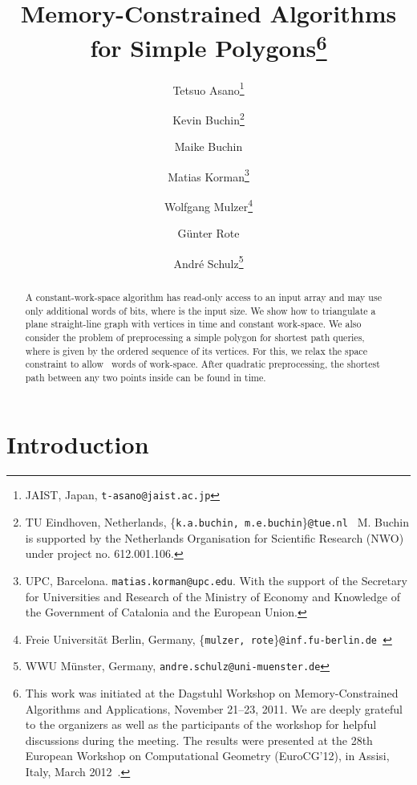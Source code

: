\documentclass[11pt,a4paper]{article}
\begin{document}
\title{Memory-Constrained Algorithms for Simple Polygons\thanks{This work was initiated at the Dagstuhl Workshop on
Memory-Constrained Algorithms and Applications,
 November 21--23, 2011. We are deeply grateful
to the organizers as well as the participants of the workshop for
helpful discussions during the meeting.
The results were presented
at the
28th European Workshop on Computational Geometry (EuroCG'12), in Assisi, Italy, March 2012~\cite{abbkmrs-mcasp-12}.}}

\author{
Tetsuo Asano\thanks{JAIST, Japan, \texttt{t-asano@jaist.ac.jp}} \and
Kevin Buchin\thanks{TU Eindhoven, Netherlands, \{\texttt{k.a.buchin, m.e.buchin}\}\texttt{@tue.nl } M. Buchin is supported by the Netherlands Organisation for Scientific Research
(NWO) under project no. 612.001.106. } \and
Maike Buchin\footnotemark[3] \and
Matias Korman\thanks{UPC, Barcelona. {\tt{matias.korman@upc.edu}}. With the support of the Secretary for Universities and
Research of the Ministry of Economy and Knowledge of the Government of Catalonia and the European Union.} \and
Wolfgang Mulzer\thanks{Freie Universit\"at Berlin,
Germany, \{\texttt{mulzer, rote}\}\texttt{@inf.fu-berlin.de } } \and
G\"unter Rote\footnotemark[5] \and
Andr\'e Schulz\thanks{WWU M\"unster, Germany, \texttt{andre.schulz@uni-muenster.de} }
}


\maketitle

\begin{abstract}
A constant-work-space algorithm has read-only access
to an input array and may use only  additional
words of  bits, where  is the input size.
We show how to triangulate a
plane straight-line graph with  vertices in  time and constant work-space.
We also consider the problem of preprocessing a simple
polygon  for shortest path queries, where  is given by
the ordered sequence of its  vertices.
For this, we relax the space constraint to allow ~words of work-space.
After quadratic preprocessing, the shortest path
between any two points inside  can be found in  time.
\end{abstract}


\section{Introduction}
\label{sec:intro}
\end{document}
